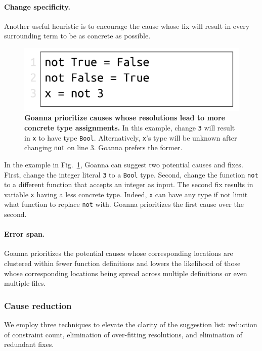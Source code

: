     \paragraph{Change specificity.}
	Another useful heuristic is to encourage the cause whose fix will result in every surrounding term to be as concrete as possible.
	
	
   \begin{figure}[htb!]
        \centering
        \includegraphics[width=0.5\linewidth]{images/Specificity}
        \caption{\textbf{Goanna prioritize causes whose resolutions lead to more concrete type assignments.} In this example, change \texttt{3} will result in \texttt{x} to have type \texttt{Bool}. Alternatively, \texttt{x}'s type will be unknown after changing \texttt{not} on line 3. Goanna prefers the former.} 
        \label{fig:specificity}
    \end{figure}

    In the example in Fig.~\ref{fig:specificity}, Goanna can suggest two potential causes and fixes. First, change the integer literal \texttt{3} to a \texttt{Bool} type. Second, change the function \texttt{not} to a different function that accepts an integer as input. The second fix results in variable \texttt{x} having a less concrete type. Indeed, \texttt{x} can have any type if not limit what function to replace \texttt{not} with. Goanna prioritizes the first cause over the second. 

    \paragraph{Error span.}
    Goanna prioritizes the potential causes whose corresponding locations are clustered within fewer function definitions and lowers the likelihood of those whose corresponding locations being spread across multiple definitions or even multiple files.  

    
    \subsubsection{Cause reduction} \label{sub:optimization}
    
    We employ three techniques to elevate the clarity of the suggestion list: reduction of constraint count, elimination of over-fitting resolutions, and elimination of redundant fixes.

